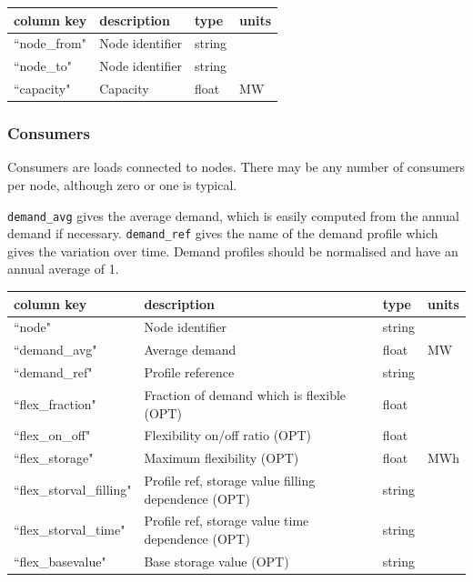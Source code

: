 \documentclass{article}
\begin{document}
\medskip
\begin{tabular}{llll}
	\hline
	column key & description & type & units \\
	\hline
	``node\_from"	&	Node identifier 	& string	& \\
	``node\_to"		&	Node identifier	& string	& \\
	``capacity"		&	Capacity & float		& MW \\
	\hline
\end{tabular}


\subsubsection{Consumers}
Consumers are loads connected to nodes. There may be any number of consumers per node, although zero or one is typical.

\texttt{demand\_avg} gives the average demand, which is easily computed from the annual demand if necessary.
\texttt{demand\_ref} gives the name of the demand profile which gives the variation over time. Demand profiles should be normalised and have an annual average of 1.

\medskip
\begin{tabular}{llll}
	\hline
	column key & description & type & units \\
	\hline
	``node"			& Node identifier 	& string		& \\
	``demand\_avg"		& Average demand	& float		& MW \\
	``demand\_ref"		& Profile reference	& string	&  \\
	``flex\_fraction"		& Fraction of demand which is flexible (OPT) 	& float	& \\
	``flex\_on\_off"		& Flexibility on/off ratio (OPT)		& float		&  \\
	``flex\_storage"				& Maximum flexibility (OPT)	& float		& MWh \\
	``flex\_storval\_filling"& Profile ref, storage value filling dependence (OPT)	& string	&  \\
	``flex\_storval\_time"& Profile ref, storage value time dependence (OPT)	& string	&  \\
	``flex\_basevalue"			& Base storage value (OPT)	& string	& \\
	\hline
\end{tabular}
\end{document}
